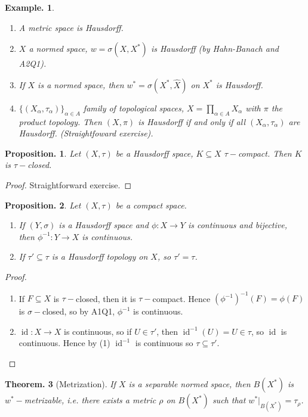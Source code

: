 \documentclass[11pt, a4paper]{memoir}
\theoremstyle{change}
\newtheorem{theorem}{Theorem.}[section]
\newtheorem{proposition}[theorem]{Proposition.}
\theoremstyle{plain}
\theoremstyle{nonumberplain}
\newtheorem{example}{Example.}
\newtheorem{proof}{Proof}
\DeclareMathOperator{\id}{id}
\numberwithin{equation}{section}
\begin{document}
\begin{example}
    \begin{enumerate}[nl,r]
        \item A metric space is Hausdorff.
        \item $X$ a normed space, $w=\sigma(X,X^*)$ is Hausdorff (by Hahn-Banach and A2Q1).
        \item If $X$ is a normed space, then $w^*=\sigma(X^*,\hat X)$ on $X^*$ is Hausdorff.
        \item $\{(X_\alpha,\tau_\alpha)\}_{\alpha\in A}$ family of topological spaces, $X=\prod_{\alpha\in A}X_\alpha$ with $\pi$ the product topology.
            Then $(X,\pi)$ is Hausdorff if and only if all $(X_\alpha,\tau_\alpha)$ are Hausdorff.
            (Straightfoward exercise).
    \end{enumerate}
\end{example}
\begin{proposition}
    Let $(X,\tau)$ be a Hausdorff space, $K\subseteq X$ $\tau-$compact.
    Then $K$ is $\tau-$closed.
\end{proposition}
\begin{proof}
    Straightforward exercise.
\end{proof}
\begin{proposition}
    Let $(X,\tau)$ be a compact space.
    \begin{enumerate}[nl,r]
        \item If $(Y,\sigma)$ is a Hausdorff space and $\phi:X\to Y$ is continuous and bijective, then $\phi^{-1}:Y\to X$ is continuous.
        \item If $\tau'\subseteq\tau$ is a Hausdorff topology on $X$, so $\tau'=\tau$.
    \end{enumerate}
\end{proposition}
\begin{proof}
    \begin{enumerate}[nl,r]
        \item If $F\subseteq X$ is $\tau-$closed, then it is $\tau-$compact.
            Hence $(\phi^{-1})^{-1}(F)=\phi(F)$ is $\sigma-$closed, so by A1Q1, $\phi^{-1}$ is continuous.
        \item $\id:X\to X$ is continuous, so if $U\in\tau'$, then $\id^{-1}(U)=U\in\tau$, so $\id$ is continuous.
            Hence by (1) $\id^{-1}$ is continuous so $\tau\subseteq\tau'$.
    \end{enumerate}
\end{proof}
\begin{theorem}[Metrization]
    If $X$ is a separable normed space, then $B(X^*)$ is $w^*-$metrizable, i.e. there exists a metric $\rho$ on $B(X^*)$ such that $w^*|_{B(X^*)}=\tau_\rho$.
\end{theorem}
\end{document}
